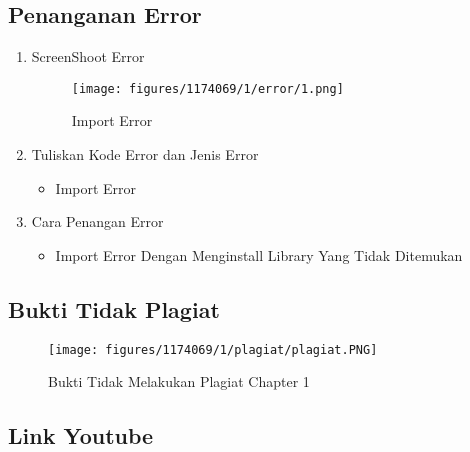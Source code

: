 \subsection{Penanganan Error}
\begin{enumerate}
	\item ScreenShoot Error
	\begin{figure}[H]
		\texttt{[image: figures/1174069/1/error/1.png]}
		\centering
		\caption{Import Error}
	\end{figure}

	\item Tuliskan Kode Error dan Jenis Error
	\begin{itemize}
		\item Import Error
	\end{itemize}
	\item Cara Penangan Error
	\begin{itemize}
		\item Import Error
		\hfill\break
		Dengan Menginstall Library Yang Tidak Ditemukan
	\end{itemize}
\end{enumerate}

\subsection{Bukti Tidak Plagiat}
\begin{figure}[H]
	\texttt{[image: figures/1174069/1/plagiat/plagiat.PNG]}
	\centering
	\caption{Bukti Tidak Melakukan Plagiat Chapter 1}
\end{figure}

\subsection{Link Youtube}

